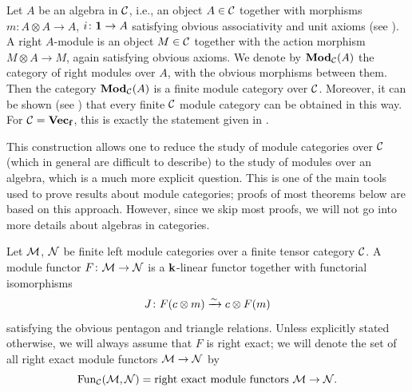 \begin{example}\label{x:algebra-in-cat}
  Let $A$ be an algebra in $\mathcal{C}$, i.e., an object $A\in \mathcal{C}$ together with
  morphisms $m\colon A\otimes A\to A$, $i\colon \mathbf{1}\to A$ satisfying obvious
  associativity and unit axioms (see \cite[Section 7.8]{etingof-fusion}). A
  right $A$-module is an object $M\in \mathcal{C}$ together with the action morphism
  $M\otimes A\to M$, again satisfying obvious axioms. We denote by
  $\mathbf{Mod}_{\mathcal{C}}(A)$ the category of right modules over $A$, with the obvious
  morphisms between them. Then the category $\mathbf{Mod}_{\mathcal{C}}(A)$ is a finite module
  category over $\mathcal{C}$. Moreover, it can be shown (see
  \cite[Corollary 7.10.5]{etingof-fusion}) that every finite $\mathcal{C}$ module
  category can be obtained in this way. For $\mathcal{C}=\mathbf{Vec_f}$, this is exactly the
  statement given in .

  This construction allows one to reduce the study of module categories over
  $\mathcal{C}$ (which in general are difficult to describe) to the study of modules
  over an algebra, which is a much more explicit question. This is one of the
  main tools used to prove results about module categories; proofs of most
  theorems below are based on this approach. However, since we skip most
  proofs, we will not go into more details about algebras in categories.
\end{example}


\begin{definition}\label{d:module-functor}
  Let $\mathcal{M}$, $\mathcal{N}$ be finite left module categories over a finite tensor
  category $\mathcal{C}$. A module functor $F\colon \mathcal{M}\to \mathcal{N}$ is a $\mathbf{k}$-linear
  functor together with functorial isomorphisms
  $$
    J\colon F(c\otimes m)\xrightarrow{\sim} c\otimes F(m)
  $$
  satisfying the obvious pentagon and triangle relations. Unless explicitly
  stated otherwise, we will always assume that $F$ is right exact; we will
  denote the set of all right exact module functors $\mathcal{M}\to \mathcal{N}$ by
  $$
    \operatorname{Fun}_{\mathcal{C}}(\mathcal{M}, \mathcal{N})=\text{right exact module functors }\mathcal{M}\to\mathcal{N}.
  $$
\end{definition}


